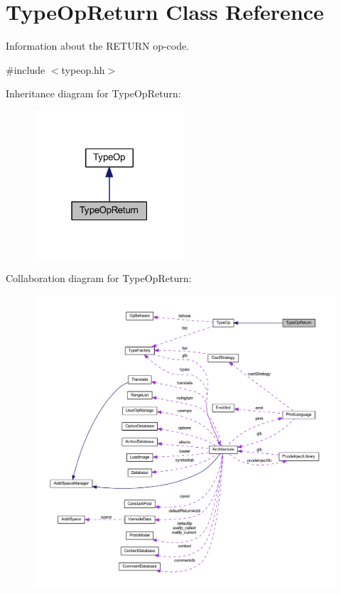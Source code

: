 \hypertarget{class_type_op_return}{}\section{Type\+Op\+Return Class Reference}
\label{class_type_op_return}


Information about the R\+E\+T\+U\+RN op-\/code.  




{\ttfamily \#include $<$typeop.\+hh$>$}



Inheritance diagram for Type\+Op\+Return\+:
\nopagebreak
\begin{figure}[H]
\begin{center}
\leavevmode
\includegraphics[width=159pt]{class_type_op_return__inherit__graph}
\end{center}
\end{figure}


Collaboration diagram for Type\+Op\+Return\+:
\nopagebreak
\begin{figure}[H]
\begin{center}
\leavevmode
\includegraphics[width=350pt]{class_type_op_return__coll__graph}
\end{center}
\end{figure}
